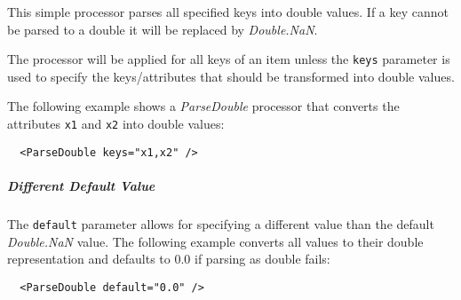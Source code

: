 
This simple processor parses all specified keys into double values. If a
key cannot be parsed to a double it will be replaced by
\emph{Double.NaN}.

The processor will be applied for all keys of an item unless the
\texttt{keys} parameter is used to specify the keys/attributes that
should be transformed into double values.

The following example shows a \emph{ParseDouble} processor that converts
the attributes \texttt{x1} and \texttt{x2} into double values:

\begin{verbatim}
  <ParseDouble keys="x1,x2" />
\end{verbatim}
\subparagraph{Different Default Value}

The \texttt{default} parameter allows for specifying a different value
than the default \emph{Double.NaN} value. The following example converts
all values to their double representation and defaults to 0.0 if parsing
as double fails:

\begin{verbatim}
  <ParseDouble default="0.0" />
\end{verbatim}


\begin{table}[h]
\end{table}
